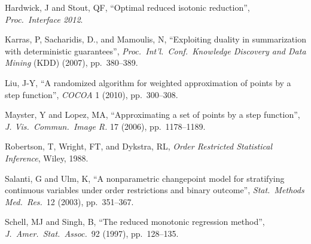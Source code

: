 \documentclass[11pt]{article}
\newcommand{\bibshrink}{\vspace{-0.04in}}
\begin{document}
\begin{thebibliography}{99}
   Hardwick, J and Stout, QF,
  ``Optimal reduced isotonic reduction'',
  \textit{Proc.\ Interface 2012}.
\bibshrink
  
  Karras, P, Sacharidis, D., and Mamoulis, N,
  ``Exploiting duality in summarization with deterministic guarantees'',
  \textit{Proc.\ Int'l.\ Conf.\ Knowledge Discovery and Data Mining} (KDD) (2007),
  pp.\ 380--389.
\bibshrink
  
 Liu, J-Y,
  ``A randomized algorithm for weighted approximation of points by a step function'',
  \textit{COCOA} 1 (2010), pp.\ 300--308.
\bibshrink
  
  Mayster, Y and Lopez, MA,
  ``Approximating a set of points by a step function'',
  \textit{J. Vis.\ Commun.\ Image R.} 17 (2006), pp.\ 1178--1189.
\bibshrink
  
  Robertson, T, Wright, FT, and Dykstra, RL,
  \textit{Order Restricted Statistical Inference}, Wiley, 1988.
\bibshrink
  
  Salanti, G and Ulm, K,
  ``A nonparametric changepoint model for stratifying continuous variables under order
  restrictions and binary outcome'',
  \textit{Stat.\ Methods Med.\ Res.}\ 12 (2003), pp.\ 351--367.
\bibshrink

  Schell, MJ and Singh, B,
  ``The reduced monotonic regression method'',
  \textit{J.\ Amer.\ Stat.\ Assoc.}\ 92 (1997), pp.\ 128--135.


\end{thebibliography}
\end{document}
